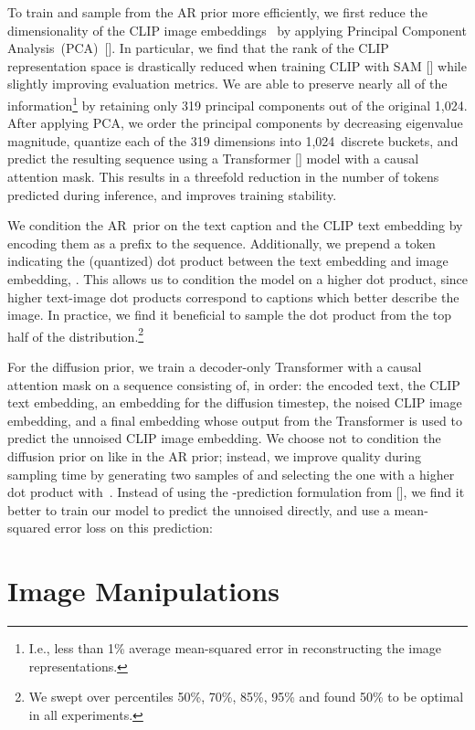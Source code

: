 \documentclass{article}
\newcommand{\shortcite}[1]{[\citenum{#1}]}
\newcommand{\namecite}[1]{\citeauthor{#1} [\citenum{#1}]}
\begin{document}
To train and sample from the AR prior more efficiently, we first reduce the dimensionality of the CLIP image embeddings~ by applying Principal Component Analysis~(PCA)~\shortcite{pca}. In particular, we find that the rank of the CLIP representation space is drastically reduced when training CLIP with SAM \shortcite{sam} while slightly improving evaluation metrics. We are able to preserve nearly all of the information\footnote{I.e., less than 1\% average mean-squared error in reconstructing the image representations.} by retaining only 319 principal components out of the original 1,024. After applying PCA, we order the principal components by decreasing eigenvalue magnitude, quantize each of the 319 dimensions into 1,024~discrete buckets, and predict the resulting sequence using a Transformer \shortcite{transformer} model with a causal attention mask. This results in a threefold reduction in the number of tokens predicted during inference, and improves training stability.

We condition the AR~prior on the text caption and the CLIP text embedding by encoding them as a prefix to the sequence. Additionally, we prepend a token indicating the (quantized) dot product between the text embedding and image embedding, . This allows us to condition the model on a higher dot product, since higher text-image dot products correspond to captions which better describe the image. In practice, we find it beneficial to sample the dot product from the top half of the distribution.\footnote{We swept over percentiles 50\%, 70\%, 85\%, 95\% and found 50\% to be optimal in all experiments.} 

For the diffusion prior, we train a decoder-only Transformer with a causal attention mask on a sequence consisting of, in order: the encoded text, the CLIP text embedding, an embedding for the diffusion timestep, the noised CLIP image embedding, and a final embedding whose output from the Transformer is used to predict the unnoised CLIP image embedding. We choose not to condition the diffusion prior on  like in the AR prior; instead, we improve quality during sampling time by generating two samples of  and selecting the one with a higher dot product with~. Instead of using the -prediction formulation from \namecite{ddpm}, we find it better to train our model to predict the unnoised  directly, and use a mean-squared error loss on this prediction:


\section{Image Manipulations}
\end{document}
